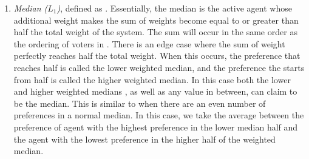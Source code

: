 \begin{enumerate}
    \item {
        \textit{Median ($L_1$)}, defined as
        $$.
%
%
%
        Essentially, the median is the active agent whose additional weight makes the
        sum of weights become equal to or greater than half the total weight of the
        system.
        The sum will occur in the same order as the ordering of voters in
        \systemproxies.
        There is an edge case where the sum of weight perfectly reaches half the
        total weight.
        When this occurs, the preference that reaches half is called the lower
        weighted median, and the preference the starts from half is called the higher
        weighted median.
        In this case both the lower and higher weighted medians
        , as well as any value in between, can claim to be the median.
        This is similar to when there are an even number of preferences in a normal
        median.
        In this case, we take the average between the preference of agent with
        the highest preference in the lower median half and the agent with the lowest
        preference in the higher half of the weighted median.
    }

\end{enumerate}
